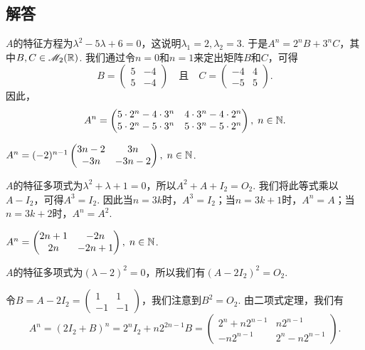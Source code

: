 \subsection{解答}
\begin{solution}
  $A$的特征方程为$\lambda^2-5\lambda+6=0$，这说明$\lambda_1=2,\lambda_2=3$. 于是$A^n=2^nB+3^nC$，其中$B,C\in\mathscr M_2(\mathbb R)$. 我们通过令$n=0$和$n=1$来定出矩阵$B$和$C$，可得
  \[
    B = \begin{pmatrix}
      5 & -4 \\
      5 & -4
    \end{pmatrix} \quad \text{且} \quad
    C = \begin{pmatrix}
      -4 & 4 \\
      -5 & 5
    \end{pmatrix}.
  \]
  因此，
  \[
    A^n = \begin{pmatrix}
      5\cdot2^n - 4\cdot 3^n & 4\cdot 3^n - 4\cdot 2^n \\
      5\cdot 2^n - 5\cdot 3^n & 5\cdot 3^n - 5\cdot 2^n
    \end{pmatrix},\; n\in\mathbb N.
  \]
\end{solution}

\begin{solution}
  $A^n=(-2)^{n-1}\begin{pmatrix}
    3n - 2 & 3n \\
    -3n & -3n - 2
  \end{pmatrix},\; n\in\mathbb N$.
\end{solution}

\begin{solution}
  $A$的特征多项式为$\lambda^2+\lambda+1=0$，所以$A^2+A+I_2=O_2$. 我们将此等式乘以$A-I_2$，可得$A^3=I_2$. 因此当$n=3k$时，$A^3=I_2$；当$n=3k+1$时，$A^n=A$；当$n=3k+2$时，$A^n=A^2$.
\end{solution}

\begin{solution}
  $A^n=\begin{pmatrix}
    2n + 1 & -2n \\
    2n & -2n + 1
  \end{pmatrix},\; n\in\mathbb N$.
\end{solution}

\begin{solution}
  $A$的特征多项式为$(\lambda-2)^2=0$，所以我们有$(A-2I_2)^2=O_2$.

  令$B=A-2I_2=\begin{pmatrix}
    1 & 1 \\
    -1 & -1
  \end{pmatrix}$，我们注意到$B^2=O_2$. 由二项式定理，我们有
  \[
    A^n = (2I_2 + B)^n = 2^nI_2 + n2^{2n-1}B =
    \begin{pmatrix}
      2^n + n2^{n-1} & n2^{n-1} \\
      -n2^{n-1} & 2^n - n2^{n-1}
    \end{pmatrix}.
  \]
\end{solution}

